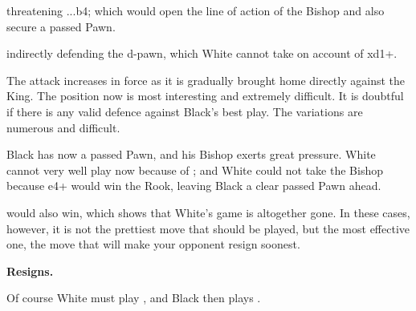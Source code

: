 \documentclass[10pt,twoside]{article}
\begin{document}
threatening ...b4; which would open the line of action of the Bishop and also secure a passed Pawn.


indirectly defending the d-pawn, which White cannot take on account of \figQ xd1+.


The attack increases in force as it is gradually brought home directly against the King. The position now is most interesting and extremely difficult. It is doubtful if there is any valid defence against Black's best play. The variations are numerous and difficult.

\board


Black has now a passed Pawn, and his Bishop exerts great pressure. White cannot very well play now  because of ; and White could not take the Bishop because \figQ e4+ would win the Rook, leaving Black a clear passed Pawn ahead.


\board


 would also win, which shows that White's game is altogether gone. In these cases, however, it is not the prettiest move that should be played, but the most effective one, the move that will make your opponent resign soonest.


\noindent\textbf{Resigns.}

Of course White must play , and Black then plays .
\end{document}
